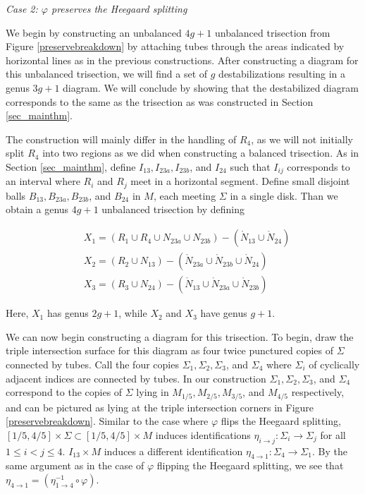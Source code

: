 \documentclass[12pt]{amsart}
\theoremstyle{definition}
\theoremstyle{remark}
\begin{document}
\smallskip
\noindent\textit{Case 2: $\varphi$ preserves the Heegaard splitting}\ \

We begin by constructing an unbalanced $4g+1$ unbalanced trisection from Figure \ref{preservebreakdown} by attaching tubes through the areas indicated by horizontal lines as in the previous constructions.  After constructing a diagram for this unbalanced trisection, we will find a set of $g$ destabilizations resulting in a genus $3g+1$ diagram.  We will conclude by showing that the destabilized diagram corresponds to the same as the trisection as was constructed in Section \ref{sec_mainthm}.

The construction will mainly differ in the handling of $R_4$, as we will not initially split $R_4$ into two regions as we did when constructing a balanced trisection.  As in Section \ref{sec_mainthm}, define $I_{13}, I_{23a}, I_{23b}$, and $I_{24}$ such that $I_{ij}$ corresponds to an interval where $R_i$ and $R_j$ meet in a horizontal segment.  Define small disjoint balls $B_{13}, B_{23a}, B_{23b}$, and $B_{24}$ in $M$, each meeting $\Sigma$ in a single disk.  Than we obtain a genus $4g+1$ unbalanced trisection by defining

\begin{align*}
&X_1 = (R_1 \cup R_4 \cup N_{23a} \cup N_{23b}) - (\mathring N_{13} \cup \mathring N_{24}) \\
&X_2 = (R_2 \cup N_{13}) - (\mathring N_{23a} \cup \mathring N_{23b} \cup \mathring N_{24}) \\
&X_3 = (R_3 \cup N_{24}) - (\mathring N_{13} \cup \mathring N_{23a} \cup \mathring N_{23b})
\end{align*}

Here, $X_1$ has genus $2g + 1$, while $X_2$ and $X_3$ have genus $g+1$.

We can now begin constructing a diagram for this trisection.  To begin, draw the triple intersection surface for this diagram as four twice punctured copies of $\Sigma$ connected by tubes.
Call the four copies $\Sigma_1, \Sigma_2, \Sigma_3$, and $\Sigma_4$ where $\Sigma_i$ of cyclically adjacent indices are connected by tubes.
In our construction $\Sigma_1, \Sigma_2, \Sigma_3$, and $\Sigma_4$ correspond to the copies of $\Sigma$ lying in $M_{1/5}, M_{2/5}, M_{3/5}$, and $M_{4/5}$ respectively, and can be pictured as lying at the triple intersection corners in Figure \ref{preservebreakdown}.
Similar to the case where $\varphi$ flips the Heegaard splitting, $[1/5, 4/5] \times \Sigma \subset [1/5, 4/5] \times M$ induces identifications $\eta_{i \to j}\colon \Sigma_i \to \Sigma_j$ for all $1 \le i < j \le 4$.
$I_{13} \times M$ induces a different identification $\eta_{4 \to 1}\colon \Sigma_4 \to \Sigma_1$.
By the same argument as in the case of $\varphi$ flipping the Heegaard splitting, we see that $\eta_{4 \to 1} = (\eta_{1 \to 4}^{-1} \circ \varphi)$.
\end{document}
